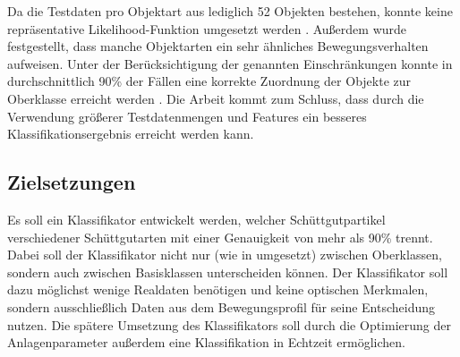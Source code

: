 Da die Testdaten pro Objektart aus lediglich 52 Objekten bestehen, konnte keine repräsentative Likelihood-Funktion umgesetzt werden \cite[S. 24]{MA}. Außerdem wurde festgestellt, dass manche Objektarten ein sehr ähnliches Bewegungsverhalten aufweisen. Unter der Berücksichtigung der genannten Einschränkungen konnte in durchschnittlich 90\% der Fällen eine korrekte Zuordnung der Objekte zur Oberklasse erreicht werden \cite[S. 24]{MA}. Die Arbeit kommt zum Schluss, dass durch die Verwendung größerer Testdatenmengen und Features ein besseres Klassifikationsergebnis erreicht werden kann.

\subsection{Zielsetzungen}
\label{sec:Goal}
Es soll ein Klassifikator entwickelt werden, welcher Schüttgutpartikel verschiedener Schüttgutarten mit einer Genauigkeit von mehr als 90\% trennt. Dabei soll der Klassifikator nicht nur (wie in \cite{MA} umgesetzt) zwischen Oberklassen, sondern auch zwischen Basisklassen unterscheiden können. Der Klassifikator soll dazu möglichst wenige Realdaten benötigen und keine optischen Merkmalen, sondern ausschließlich Daten aus dem Bewegungsprofil für seine Entscheidung nutzen. Die spätere Umsetzung des Klassifikators soll durch die Optimierung der Anlagenparameter außerdem eine Klassifikation in Echtzeit ermöglichen.




